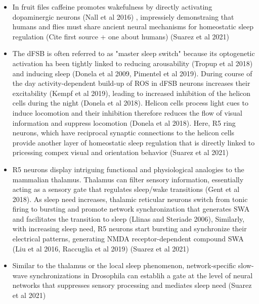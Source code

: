 \documentclass[11pt]{article}
\begin{document}
\begin{itemize}
    \item In fruit files caffeine promotes wakefulness by directly activating dopaminergic neurons
    (Nall et al 2016) \cite{suarez-grimaltNeuralArchitectureSleep2021}, impressiely demonstraing that humans and flies
    must share ancient neural mechanisms for homeostatic sleep regulation \cite{suarez-grimaltNeuralArchitectureSleep2021}
    (Cite first source + one about humans)
    (Suarez et al 2021)

    \item The dFSB is often referred to as "master sleep switch" because its optogenetic activation ha been tightly
    linked to reducing arousability (Tropup et al 2018) and inducing sleep (Donela et al 2009, Pimentel et al 2019).
    During course of the day activity-dependent build-up of ROS in dFSB neurons increases their excitability (Kempf et al 2019),
    leading to increased inhibition of the helicon cells during the night (Donela et al 2018). Helicon cells process
    light cues to induce locomotion and their inhibition therefore reduces the flow of visual information and
    suppress locomotion (Donela et al 2018). Here, R5 ring neurons, which have reciprocal synaptic connections to the
    helicon cells provide another layer of homeostatic sleep regulation that is directly linked to pricessing
    compex visual and orientation behavior \cite{suarez-grimaltNeuralArchitectureSleep2021}
    (Suarez et al 2021)

    \item R5 neurons display intriguing functional and physiological analogies to the mammalian thalamus.
    Thalamus can filter sensory information, essentially acting as a sensory gate that regulates sleep/wake transitions
    (Gent et al 2018). As sleep need increases, thalamic reticular neurons switch from tonic firing to bursting and promote network
    synchronization that generates SWA and facilitates the transition to sleep (Llinas and Steriade 2006), Similarly,
    with increasing sleep need, R5 neurons start bursting and synchronize their electrical patterns, generating
    NMDA receptor-dependent compound SWA (Liu et al 2016, Raccuglia et al 2019) \cite{suarez-grimaltNeuralArchitectureSleep2021}
    (Suarez et al 2021)

    \item Similar to the thalamus or the local sleep phenomenon, network-specific slow-wave synchronizations in Drosophila
    can establih a gate at the level of neural networks that suppresses sensory processing and mediates sleep need \cite{suarez-grimaltNeuralArchitectureSleep2021}
    (Suarez et al 2021)


\end{itemize}
\end{document}

